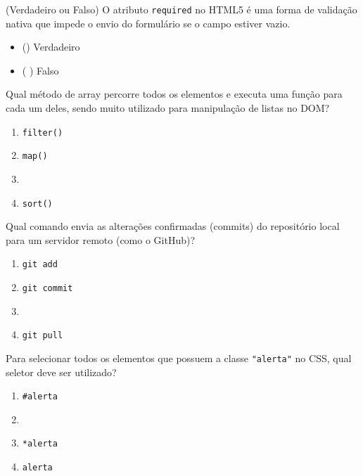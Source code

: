 \documentclass[12pt,a4paper]{article}
\newcommand{\correto}[1]{\iftoggle{gabarito}{\textbf{\color{corGabarito}#1}}{#1}}
\newcommand{\marcar}[1]{\iftoggle{gabarito}{\textbf{\color{corGabarito}#1}}{}}
\begin{document}
\begin{tcolorbox}[colback=white, colframe=azulTitulo, title=Questão 9: Validação de Formulários]
    (Verdadeiro ou Falso) O atributo \texttt{required} no HTML5 é uma forma de validação nativa que impede o envio do formulário se o campo estiver vazio.
    \begin{itemize}
        \item (\marcar{X}) Verdadeiro
        \item ( ) Falso
    \end{itemize}
\end{tcolorbox}

\begin{tcolorbox}[colback=white, colframe=azulTitulo, title=Questão 10: Lógica de Programação JS]
    Qual método de array percorre todos os elementos e executa uma função para cada um deles, sendo muito utilizado para manipulação de listas no DOM?
    \begin{enumerate}[label=\alph*)]
        \item \texttt{filter()}
        \item \texttt{map()}
        \item \correto{forEach()}
        \item \texttt{sort()}
    \end{enumerate}
\end{tcolorbox}

\begin{tcolorbox}[colback=white, colframe=azulTitulo, title=Questão 11: Controle de Versão (Git)]
    Qual comando envia as alterações confirmadas (commits) do repositório local para um servidor remoto (como o GitHub)?
    \begin{enumerate}[label=\alph*)]
        \item \texttt{git add}
        \item \texttt{git commit}
        \item \correto{git push}
        \item \texttt{git pull}
    \end{enumerate}
\end{tcolorbox}

\begin{tcolorbox}[colback=white, colframe=azulTitulo, title=Questão 12: Seletores CSS]
    Para selecionar todos os elementos que possuem a classe \texttt{"alerta"} no CSS, qual seletor deve ser utilizado?
    \begin{enumerate}[label=\alph*)]
        \item \texttt{\#alerta}
        \item \correto{.alerta}
        \item \texttt{*alerta}
        \item \texttt{alerta}
    \end{enumerate}
\end{tcolorbox}
\end{document}
